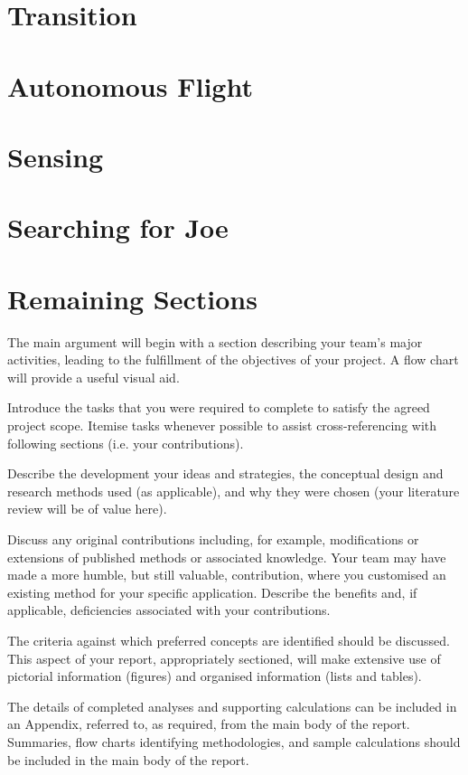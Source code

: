 \documentclass{article}
\newif\iffinal
\newcommand{\red}[1] {
	\iffinal
	\else
		\color{red}
		#1
		\color{black}
	\fi
}
\begin{document}
\section{Transition}


\section{Autonomous Flight}


\section{Sensing}


\section{Searching for Joe}


\red{
\section{Remaining Sections}
The main argument will begin with a section describing your team's major activities, leading to the fulfillment of the objectives of your project.  A flow chart will provide a useful visual aid.

Introduce the tasks that you were required to complete to satisfy the agreed project scope. Itemise tasks whenever possible to assist cross-referencing with following sections (i.e. your contributions).

Describe the development your ideas and strategies, the conceptual design and research methods used (as applicable), and why they were chosen (your literature review will be of value here).  

Discuss any original contributions including, for example, modifications or extensions of published methods or associated knowledge.  Your team may have made a more humble, but still valuable, contribution, where you customised an existing method for your specific application.  Describe the benefits and, if applicable, deficiencies associated with your contributions.

The criteria against which preferred concepts are identified should be discussed.  This aspect of your report, appropriately sectioned, will make extensive use of pictorial information (figures) and organised information (lists and tables).  

The details of completed analyses and supporting calculations can be included in an Appendix, referred to, as required, from the main body of the report.  Summaries, flow charts identifying methodologies, and sample calculations should be included in the main body of the report.
}
\end{document}
